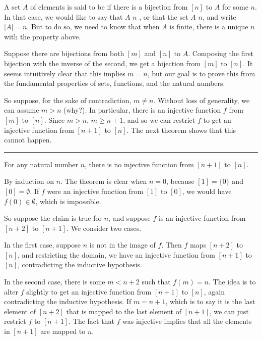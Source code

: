 \documentclass[letterpaper,10pt,english]{sphinxmanual}
\begin{document}
\sphinxAtStartPar
A set \(A\) of elements is said to be  if there is a bijection from \([n]\) to \(A\) for some \(n\). In that case, we would like to say that \(A\)  \(n\) , or that the set \(A\)  \(n\), and write \(|A| = n\). But to do so, we need to know that when \(A\) is finite, there is a unique \(n\) with the property above.

\sphinxAtStartPar
Suppose there are bijections from both \([m]\) and \([n]\) to \(A\). Composing the first bijection with the inverse of the second, we get a bijection from \([m]\) to \([n]\). It seems intuitively clear that this implies \(m = n\), but our goal is to prove this from the fundamental properties of sets, functions, and the natural numbers.

\sphinxAtStartPar
So suppose, for the sake of contradiction, \(m \neq n\). Without loss of generality, we can assume \(m > n\) (why?). In particular, there is an injective function \(f\) from \([m]\) to \([n]\). Since \(m > n\), \(m \geq n+1\), and so we can restrict \(f\) to get an injective function from \([n+1]\) to \([n]\). The next theorem shows that this cannot happen.


\bigskip\hrule\bigskip


\sphinxAtStartPar
{} For any natural number \(n\), there is no injective function from \([n+1]\) to \([n]\).

\sphinxAtStartPar
{} By induction on \(n\). The theorem is clear when \(n = 0\), because \([1] = \{ 0 \}\) and \([0] = \emptyset\). If \(f\) were an injective function from \([1]\) to \([0]\), we would have \(f(0) \in \emptyset\), which is impossible.

\sphinxAtStartPar
So suppose the claim is true for \(n\), and suppose \(f\) is an injective function from \([n+2]\) to \([n+1]\). We consider two cases.

\sphinxAtStartPar
In the first case, suppose \(n\) is not in the image of \(f\). Then \(f\) maps \([n+2]\) to \([n]\), and restricting the domain, we have an injective function from \([n+1]\) to \([n]\), contradicting the inductive hypothesis.

\sphinxAtStartPar
In the second case, there is some \(m < n + 2\) such that \(f(m) = n\). The idea is to alter \(f\) slightly to get an injective function from \([n+1]\) to \([n]\), again contradicting the inductive hypothesis. If \(m = n + 1\), which is to say it is the last element of \([n+2]\) that is mapped to the last element of \([n+1]\), we can just restrict \(f\) to \([n+1]\). The fact that \(f\) was injective implies that all the elements in \([n+1]\) are mapped to \(n\).
\end{document}
